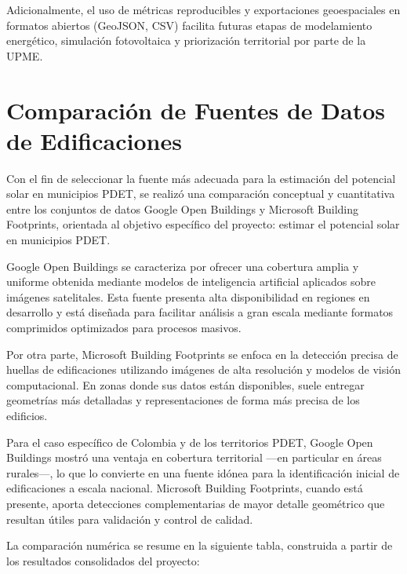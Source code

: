 \documentclass{article}
\begin{document}
Adicionalmente, el uso de métricas reproducibles y exportaciones geoespaciales en 
formatos abiertos (GeoJSON, CSV) facilita futuras etapas de modelamiento energético, 
simulación fotovoltaica y priorización territorial por parte de la UPME.



\clearpage
\section{Comparación de Fuentes de Datos de Edificaciones}

Con el fin de seleccionar la fuente más adecuada para la estimación del potencial solar en municipios PDET, se realizó una comparación conceptual y cuantitativa entre los conjuntos de datos Google Open Buildings y Microsoft Building Footprints, orientada al objetivo específico del proyecto: estimar el potencial solar en municipios PDET.

Google Open Buildings se caracteriza por ofrecer una cobertura amplia y uniforme obtenida mediante modelos de inteligencia artificial aplicados sobre imágenes satelitales. Esta fuente presenta alta disponibilidad en regiones en desarrollo y está diseñada para facilitar análisis a gran escala mediante formatos comprimidos optimizados para procesos masivos.

Por otra parte, Microsoft Building Footprints se enfoca en la detección precisa de huellas de edificaciones utilizando imágenes de alta resolución y modelos de visión computacional. En zonas donde sus datos están disponibles, suele entregar geometrías más detalladas y representaciones de forma más precisa de los edificios.

Para el caso específico de Colombia y de los territorios PDET, Google Open Buildings mostró una ventaja en cobertura territorial —en particular en áreas rurales—, lo que lo convierte en una fuente idónea para la identificación inicial de edificaciones a escala nacional. Microsoft Building Footprints, cuando está presente, aporta detecciones complementarias de mayor detalle geométrico que resultan útiles para validación y control de calidad.

La comparación numérica se resume en la siguiente tabla, construida a partir de los resultados consolidados del proyecto:
\end{document}
